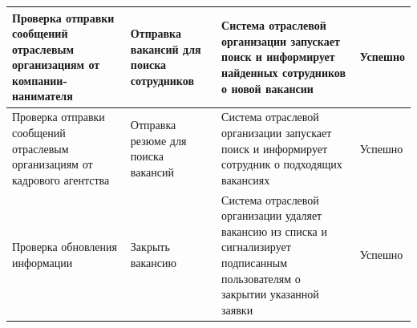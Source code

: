 \begin{longtable}[ht]{|p{}|p{}|p{}|p{}|}
\hline
Проверка отправки сообщений отраслевым организациям от компании-нанимателя  & Отправка вакансий для поиска сотрудников & Система отраслевой организации запускает поиск и информирует найденных сотрудников о новой вакансии & Успешно \\
\hline
Проверка отправки сообщений отраслевым организациям от кадрового агентства  & Отправка резюме для поиска вакансий & Система отраслевой организации запускает поиск и информирует сотрудник о подходящих вакансиях & Успешно \\
\hline
Проверка обновления информации & Закрыть вакансию & Система отраслевой организации удаляет вакансию из списка и сигнализирует подписанным пользователям о закрытии указанной заявки & Успешно \\
\hline
\end{longtable}


























